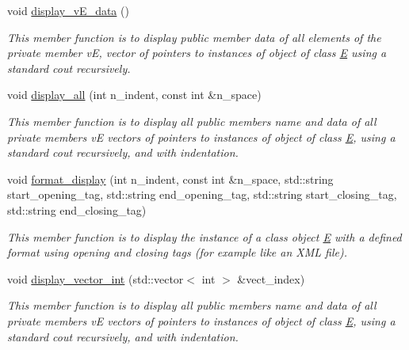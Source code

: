 \begin{DoxyCompactItemize}
void \hyperlink{group__group__display_gaf9a65156dc2432f673156f62971fab76}{display\+\_\+v\+E\+\_\+data} ()
\begin{DoxyCompactList}\small\item\em This member function is to display public member \textquotesingle{}data\textquotesingle{} of all elements of the private member vE, vector of pointers to instances of object of class \hyperlink{classE}{E} using a standard cout recursively. \end{DoxyCompactList}\item 
void \hyperlink{group__group__display_ga631a8a99e830b25ac2fd267eef352a42}{display\+\_\+all} (int n\+\_\+indent, const int \&n\+\_\+space)
\begin{DoxyCompactList}\small\item\em This member function is to display all public members \textquotesingle{}name\textquotesingle{} and \textquotesingle{}data\textquotesingle{} of all private members vE vectors of pointers to instances of object of class \hyperlink{classE}{E}, using a standard cout recursively, and with indentation. \end{DoxyCompactList}\item 
void \hyperlink{group__group__display_ga443b2ed610b5544289880bd72591ecb7}{format\+\_\+display} (int n\+\_\+indent, const int \&n\+\_\+space, std\+::string start\+\_\+opening\+\_\+tag, std\+::string end\+\_\+opening\+\_\+tag, std\+::string start\+\_\+closing\+\_\+tag, std\+::string end\+\_\+closing\+\_\+tag)
\begin{DoxyCompactList}\small\item\em This member function is to display the instance of a class object \hyperlink{classE}{E} with a defined format using opening and closing tags (for example like an X\+ML file). \end{DoxyCompactList}\item 
void \hyperlink{group__group__display_ga775c141cef4f790b906881e26f6b452c}{display\+\_\+vector\+\_\+int} (std\+::vector$<$ int $>$ \&vect\+\_\+index)
\begin{DoxyCompactList}\small\item\em This member function is to display all public members \textquotesingle{}name\textquotesingle{} and \textquotesingle{}data\textquotesingle{} of all private members vE vectors of pointers to instances of object of class \hyperlink{classE}{E}, using a standard cout recursively, and with indentation. \end{DoxyCompactList}\item 

\end{DoxyCompactItemize}
